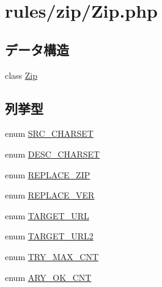 \hypertarget{zip_2_zip_8php}{
\section{rules/zip/\-Zip.php}
\label{zip_2_zip_8php}
}
\subsection*{データ構造}
\begin{DoxyCompactItemize}
\item 
class \hyperlink{class_zip}{\-Zip}
\end{DoxyCompactItemize}
\subsection*{列挙型}
\begin{DoxyCompactItemize}
\item 
enum \hyperlink{zip_2_zip_8php_a6917e80f882a8e319e4d9760052bc8c4}{\-S\-R\-C\-\_\-\-C\-H\-A\-R\-S\-E\-T} 
\item 
enum \hyperlink{zip_2_zip_8php_a04041db498ce35468b792db6570fe163}{\-D\-E\-S\-C\-\_\-\-C\-H\-A\-R\-S\-E\-T} 
\item 
enum \hyperlink{zip_2_zip_8php_a6338036fb4a9625bc327d7ae3bdcf14c}{\-R\-E\-P\-L\-A\-C\-E\-\_\-\-Z\-I\-P} 
\item 
enum \hyperlink{zip_2_zip_8php_a3335f932b08a6ea33f8a7bcb8b51fc77}{\-R\-E\-P\-L\-A\-C\-E\-\_\-\-V\-E\-R} 
\item 
enum \hyperlink{zip_2_zip_8php_afaddb223f179f9ebd0384c0d6990f523}{\-T\-A\-R\-G\-E\-T\-\_\-\-U\-R\-L} 
\item 
enum \hyperlink{zip_2_zip_8php_a686232aba27a57aa5b547b11d7522f93}{\-T\-A\-R\-G\-E\-T\-\_\-\-U\-R\-L2} 
\item 
enum \hyperlink{zip_2_zip_8php_a7871ccb17e3f226c23a9059aae2b4be0}{\-T\-R\-Y\-\_\-\-M\-A\-X\-\_\-\-C\-N\-T} 
\item 
enum \hyperlink{zip_2_zip_8php_a422b15f352c71ef0595fc838886e3934}{\-A\-R\-Y\-\_\-\-O\-K\-\_\-\-C\-N\-T} 
\end{DoxyCompactItemize}


